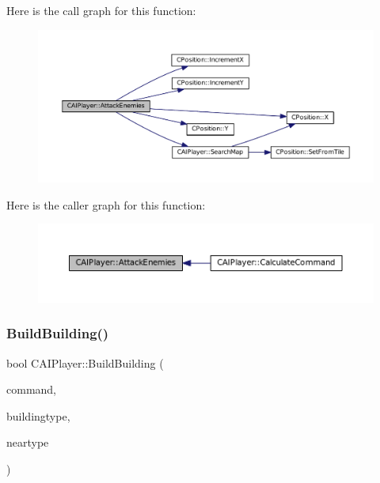 Here is the call graph for this function\+:
\nopagebreak
\begin{figure}[H]
\begin{center}
\leavevmode
\includegraphics[width=350pt]{classCAIPlayer_adf7feeba7debf9f19b000887616d7bfb_cgraph}
\end{center}
\end{figure}
Here is the caller graph for this function\+:
\nopagebreak
\begin{figure}[H]
\begin{center}
\leavevmode
\includegraphics[width=350pt]{classCAIPlayer_adf7feeba7debf9f19b000887616d7bfb_icgraph}
\end{center}
\end{figure}
\hypertarget{classCAIPlayer_a2ff5263cbaa6bfc62ffec4dbce87ba88}{}\label{classCAIPlayer_a2ff5263cbaa6bfc62ffec4dbce87ba88} 
\subsubsection{\texorpdfstring{Build\+Building()}{BuildBuilding()}}
{\footnotesize\ttfamily bool C\+A\+I\+Player\+::\+Build\+Building (\begin{DoxyParamCaption}\item[{\hyperlink{structSPlayerCommandRequest}{S\+Player\+Command\+Request} \&}]{command,  }\item[{\hyperlink{GameDataTypes_8h_a5600d4fc433b83300308921974477fec}{E\+Asset\+Type}}]{buildingtype,  }\item[{\hyperlink{GameDataTypes_8h_a5600d4fc433b83300308921974477fec}{E\+Asset\+Type}}]{neartype }\end{DoxyParamCaption})\hspace{0.3cm}{\ttfamily [protected]}}



